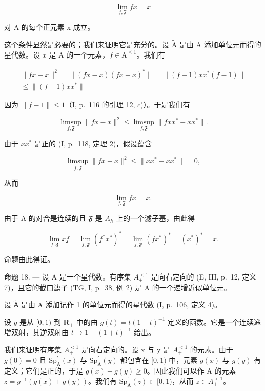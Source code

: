 \[
\lim _ {f, \mathfrak {F}} f x = x
\]

对 A 的每个正元素 x 成立。

这个条件显然是必要的；我们来证明它是充分的。设 \(\widetilde{\mathrm{A}}\) 是由 A 添加单位元而得的星代数。设 \(x\) 是 A 的一个元素，\(f \in \mathrm{A}_{+}^{\leqslant 1}\)。我们有

\[
\begin{array}{c} \| f x - x \| ^ {2} = \| (f x - x) (f x - x) ^ {*} \| = \| (f - 1) x x ^ {*} (f - 1) \| \\ \leqslant \| (f - 1) x x ^ {*} \| \end{array}
\]

因为 \(\| f - 1\| \leqslant 1\)（I, p.~116 的引理 12, \(c\))）。于是我们有

\[
\limsup _ {f, \mathfrak {F}} \| f x - x \| ^ {2} \leqslant \limsup _ {f, \mathfrak {F}} \| f x x ^ {*} - x x ^ {*} \|.
\]

由于 \(xx^{*}\) 是正的 (I, p.~118, 定理 2)，假设蕴含

\[
\limsup _ {f, \mathfrak {F}} \| f x - x \| ^ {2} \leqslant \| x x ^ {*} - x x ^ {*} \| = 0,
\]

从而

\[
\lim _ {f, \mathfrak {F}} f x = x.
\]

由于 A 的对合是连续的且 \(\mathfrak{F}\) 是 \(A_{h}\) 上的一个滤子基，由此得

\[
\lim _ {f, \mathfrak {F}} x f = \lim _ {f, \mathfrak {F}} (f ^ {*} x ^ {*}) ^ {*} = \lim _ {f, \mathfrak {F}} (f x ^ {*}) ^ {*} = (x ^ {*}) ^ {*} = x.
\]

命题由此得证。

命题 18. --- 设 A 是一个星代数。有序集 \(A_{+}^{<1}\) 是向右定向的 (E, III, p.~12, 定义 7)，且它的截口滤子 (TG, I, p.~38, 例 2) 是 A 的一个递增近似单位元。

设 \(\widetilde{\mathsf{A}}\) 是由 A 添加记作 1 的单位元而得的星代数 (I, p.~106, 定义 4)。

设 \(g\) 是从 \([0,1)\) 到 \(\mathbf{R}_+\) 中的由 \(g(t) = t(1 - t)^{-1}\) 定义的函数。它是一个连续递增双射，其逆双射由 \(t \mapsto 1 - (1 + t)^{-1}\) 给出。

我们来证明有序集 \(A_{+}^{<1}\) 是向右定向的。设 x 与 y 是 \(A_{+}^{<1}\) 的元素。由于 \(g(0)=0\) 且 \(\mathrm{Sp}_{\mathrm{A}}^{\prime}(x)\) 与 \(\mathrm{Sp}_{\mathrm{A}}^{\prime}(y)\) 都包含在 \([0,1)\) 中，元素 \(g(x)\) 与 \(g(y)\) 有定义；它们是正的，于是 \(g(x)+g(y)\geqslant0\)。因此我们可以作 A 的元素 \(z=g^{-1}(g(x)+g(y))\)。我们有 \(\mathrm{Sp}_{\mathrm{A}}^{\prime}(z)\subset[0,1)\)，从而 \(z\in A_{+}^{<1}\)。

